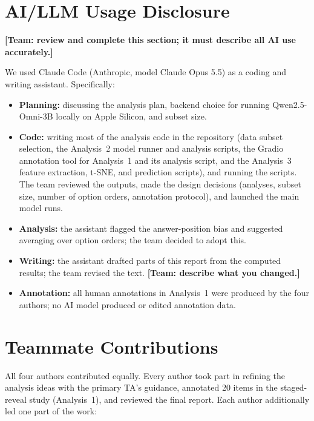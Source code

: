 \documentclass{article}
\begin{document}
\clearpage
\section{AI/LLM Usage Disclosure}

\textbf{[Team: review and complete this section; it must describe all AI use accurately.]}

We used Claude Code (Anthropic, model Claude Opus 5.5) as a coding and writing assistant. Specifically:
\begin{itemize}
  \item \textbf{Planning:} discussing the analysis plan, backend choice for running Qwen2.5-Omni-3B locally
    on Apple Silicon, and subset size.
  \item \textbf{Code:} writing most of the analysis code in the repository (data subset selection, the
    Analysis~2 model runner and analysis scripts, the Gradio annotation tool for Analysis~1 and its
    analysis script, and the Analysis~3 feature extraction, t-SNE, and prediction scripts), and running
    the scripts. The team reviewed the outputs, made the design decisions (analyses, subset size, number
    of option orders, annotation protocol), and launched the main model runs.
  \item \textbf{Analysis:} the assistant flagged the answer-position bias and suggested averaging over
    option orders; the team decided to adopt this.
  \item \textbf{Writing:} the assistant drafted parts of this report from the computed results; the team
    revised the text. \textbf{[Team: describe what you changed.]}
  \item \textbf{Annotation:} all human annotations in Analysis~1 were produced by the four authors; no AI
    model produced or edited annotation data.
\end{itemize}

\section{Teammate Contributions}

All four authors contributed equally. Every author took part in refining the analysis ideas with the
primary TA's guidance, annotated 20 items in the staged-reveal study (Analysis~1), and reviewed the final
report. Each author additionally led one part of the work:
\end{document}
